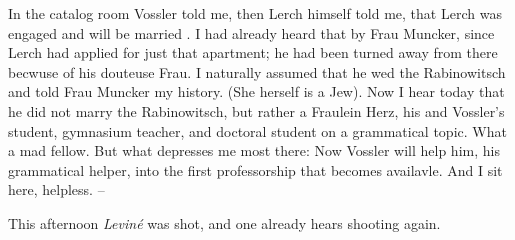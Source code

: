 
\missing

In the catalog room Vossler told me, then Lerch himself told me, that Lerch was engaged and will be married . I had already heard that by Frau Muncker, since Lerch had applied for just that apartment; he had been turned away from there becwuse of his douteuse Frau. I naturally assumed that he wed the Rabinowitsch and told Frau Muncker my history. (She herself is a  Jew). Now I hear today that he did not marry the Rabinowitsch, but rather a Fraulein Herz, his and Vossler's student, gymnasium teacher, and doctoral student on a grammatical topic. What a mad fellow. But what depresses me most there: Now Vossler will help him, his grammatical helper, into the first professorship that becomes availavle. And I sit here, helpless. -- \missing

This afternoon \textit{Leviné} was shot, and one already hears shooting again.